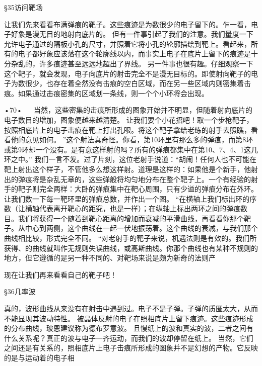 §35访问靶场

让我们先来看看布满弹痕的靶子。这些痕迹是为数很少的电子留下的。乍一看，电子好象是漫无目的地射向底片的。
但有一件事引起了我们的注意。我们量度一下允许电子通过的隔板小孔的尺寸，并照着它将小孔的轮廓描绘到靶上。看起来，所有的电子都好象应该落在这个轮廓线以内，而事实上电子在底片上留下的痕迹是十分杂乱的，许多痕迹甚至远远地超出了界线。
另一件事也很有趣。仔细观察一下这个靶子，就会发现，电子向底片的射击完全不是漫无目标的。即使射向靶子的电子为数很少，也存在着全然没有击痕的空白区域，而在另一些区域内则密集着击痕。如果通过击痕密集的区域划一条线，则一个个小环将会出现。

•70•
  
当然，这些密集的击痕所形成的图象开始并不明显，但随着射向底片的电子数目的增加，图象便越来越清楚。
让我们耍个小花招吧！取一个步枪靶子，按照相底片上的电子击痕在靶上打出孔眼。将这个靶子拿给老练的射手去照瞧，看看他的意见如何。
”这个射法真奇怪。你看，第10环里有那么多的弹痕，而第8环或第9环却一个没有。是有意这样射的吗？所有的弹痕都集中在第10、7、4、1这几环之中。”
我们一言不发。过了片刻，这位老射手说道：“胡闹！任何人也不可能在靶上射出这个样子，不管他多么想这样射。道理是这样的：如果他是个新手，他射出的弹痕将是杂乱无章的，这些弹般将均匀地分布在整个靶子上。一个有经验的射手的靶子则完全两样：大卧的弹痕集中在靶心周围，只有少谥的弹痕分布在外环。让我们数一下每一靶环里的弹痕总数，并作出一个图。
“在横轴上我们标出环的序数（让横轴代表离开靶心的距究，也是一样）；在纵轴上标出两环之间的弹痕数目。我们将获得一个随着到靶心距离的增加而衰减的平滑曲线，再看看你那个靶子。从中心到两侧，这个曲线在一起一伏地振荡着。这个曲线的衰减，与我们那个曲线相比较，形式完全不同。
“对老射手的靶子来说，机遇法则是有效的。我们所获得、的曲线就叫作无规则失误曲线，或高斯曲线。你那个曲线也有某种不规则的地方，但它遵循的是另一种不同的、对靶场来说是颇为新奇的法则产


现在让我们再来看看自己的靶子吧！

§36几率波

真的，波形曲线从来没有在射击中遇到过。电子不是子弹。子弹的质匿太大，从而不能显现其波动特性。
被晶体反射的电子在照相底片上留下痕迹。这些痕迹形成的分布曲线，玻恩建议称为德布罗意波。
且慢纸上的波和真实的波，二者之间有什么关系呢？真正的波与电子一齐运动，而我们的波却停留在纸上。
当然，它们之间还是有关系的，照相底片上电子击痕所形成的图象并不是幻想的产物。它反映的是与运动着的电子相

